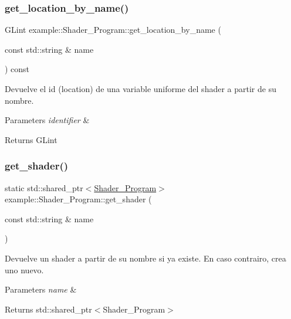 \subsubsection{\texorpdfstring{get\_location\_by\_name()}{get\_location\_by\_name()}}
{\footnotesize\ttfamily G\+Lint example\+::\+Shader\+\_\+\+Program\+::get\+\_\+location\+\_\+by\+\_\+name (\begin{DoxyParamCaption}\item[{const std\+::string \&}]{name }\end{DoxyParamCaption}) const\hspace{0.3cm}{\ttfamily [inline]}}



Devuelve el id (location) de una variable uniforme del shader a partir de su nombre. 


\begin{DoxyParams}{Parameters}
{\em identifier} & \\
\hline
\end{DoxyParams}
\begin{DoxyReturn}{Returns}
G\+Lint 
\end{DoxyReturn}
\mbox{\label{classexample_1_1_shader___program_a96511d5af161c7e28137357ffb3d878d}} 
\subsubsection{\texorpdfstring{get\_shader()}{get\_shader()}}
{\footnotesize\ttfamily static std\+::shared\+\_\+ptr$<$\mbox{\hyperlink{classexample_1_1_shader___program}{Shader\+\_\+\+Program}}$>$ example\+::\+Shader\+\_\+\+Program\+::get\+\_\+shader (\begin{DoxyParamCaption}\item[{const std\+::string \&}]{name }\end{DoxyParamCaption})\hspace{0.3cm}{\ttfamily [static]}}



Devuelve un shader a partir de su nombre si ya existe. En caso contrairo, crea uno nuevo. 


\begin{DoxyParams}{Parameters}
{\em name} & \\
\hline
\end{DoxyParams}
\begin{DoxyReturn}{Returns}
std\+::shared\+\_\+ptr$<$\+Shader\+\_\+\+Program$>$ 
\end{DoxyReturn}
\mbox{\label{classexample_1_1_shader___program_afa8e232ca74aa2ed94afaa7a14842464}} 
